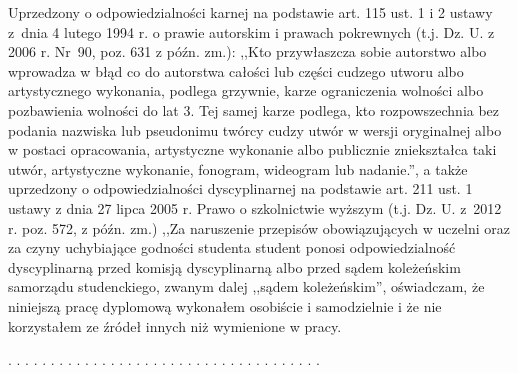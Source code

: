 Uprzedzony o odpowiedzialności karnej na podstawie art. 115 ust. 1 i 2 ustawy z~dnia 4 lutego
1994 r. o prawie autorskim i prawach pokrewnych (t.j. Dz. U. z 2006 r. Nr~90, poz. 631
z późn. zm.): ,,Kto przywłaszcza sobie autorstwo albo wprowadza w błąd co do autorstwa całości
lub części cudzego utworu albo artystycznego wykonania, podlega grzywnie, karze ograniczenia
wolności albo pozbawienia wolności do lat 3. Tej samej karze podlega, kto rozpowszechnia bez
podania nazwiska lub pseudonimu twórcy cudzy utwór w wersji oryginalnej albo w postaci
opracowania, artystyczne wykonanie albo publicznie zniekształca taki utwór, artystyczne
wykonanie, fonogram, wideogram lub nadanie.'', a także uprzedzony o odpowiedzialności
dyscyplinarnej na podstawie art. 211 ust. 1 ustawy z dnia 27 lipca 2005 r. Prawo o szkolnictwie
wyższym (t.j. Dz. U. z~2012 r. poz. 572, z późn. zm.) ,,Za naruszenie przepisów obowiązujących
w uczelni oraz za czyny uchybiające godności studenta student ponosi odpowiedzialność
dyscyplinarną przed komisją dyscyplinarną albo przed sądem koleżeńskim samorządu
studenckiego, zwanym dalej ,,sądem koleżeńskim'', oświadczam, że niniejszą pracę dyplomową
wykonałem osobiście i samodzielnie i że nie korzystałem ze źródeł innych niż
wymienione w pracy.\\[1cm]

\begin{flushright}
. . . . . . . . . . . . . . . . . . . . . . . . . . . . . . . . . . . . .
\end{flushright}


\czystastopka

\pagebreak